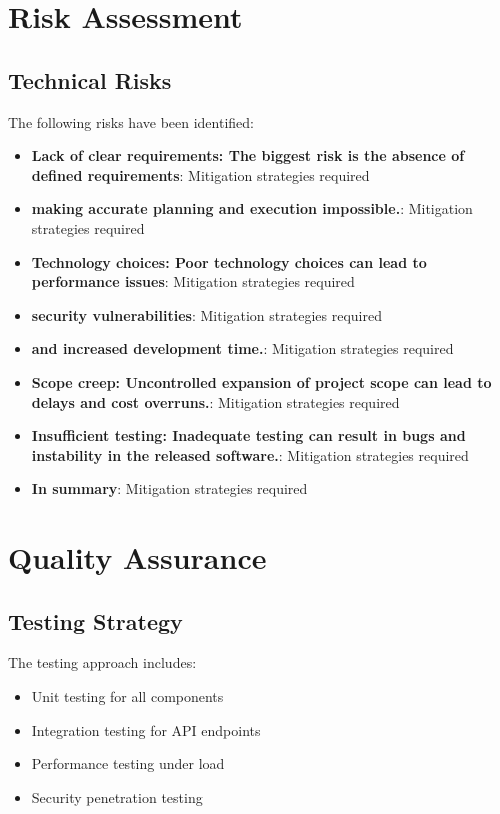 \documentclass[11pt,a4paper,oneside]{article}
\begin{document}
\section{Risk Assessment}

\subsection{Technical Risks}

The following risks have been identified:
\begin{itemize}
\item \textbf{Lack of clear requirements: The biggest risk is the absence of defined requirements}: Mitigation strategies required
\item \textbf{making accurate planning and execution impossible.}: Mitigation strategies required
\item \textbf{Technology choices: Poor technology choices can lead to performance issues}: Mitigation strategies required
\item \textbf{security vulnerabilities}: Mitigation strategies required
\item \textbf{and increased development time.}: Mitigation strategies required
\item \textbf{Scope creep: Uncontrolled expansion of project scope can lead to delays and cost overruns.}: Mitigation strategies required
\item \textbf{Insufficient testing: Inadequate testing can result in bugs and instability in the released software.}: Mitigation strategies required
\item \textbf{In summary}: Mitigation strategies required
\end{itemize}

\section{Quality Assurance}

\subsection{Testing Strategy}

The testing approach includes:
\begin{itemize}
\item Unit testing for all components
\item Integration testing for API endpoints
\item Performance testing under load
\item Security penetration testing
\end{itemize}
\end{document}
